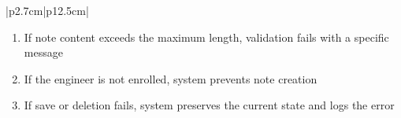 \begin{table}[H]
\begin{tabular}{|p{2.7cm}|p{12.5cm}|}
\begin{minipage}[t]{\linewidth}
                                          \begin{enumerate}[topsep=0pt,itemsep=1pt,parsep=0pt,partopsep=0pt]
                                              \item If note content exceeds the maximum length, validation fails with a specific
                                                    message
                                              \item If the engineer is not enrolled, system prevents note creation
                                              \item If save or deletion fails, system preserves the current state and logs the
                                                    error
                                          \end{enumerate}
                                      \end{minipage}             \\
            \hline
        \end{tabular}
        \label{tab:eng-notes}
    \end{table}

